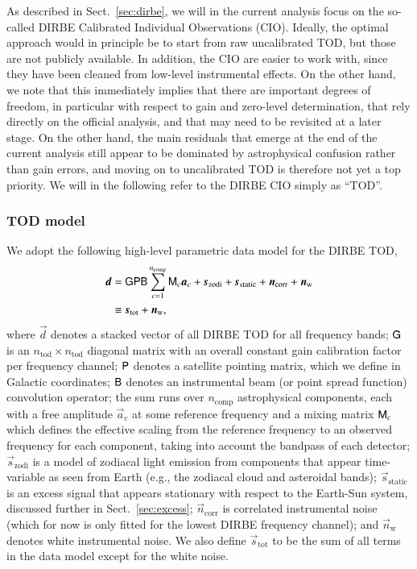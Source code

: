 \documentclass{aa}
\newcommand{\dv}[0]{\vec{d}}
\newcommand{\B}[0]{\tens{B}}
\newcommand{\G}[0]{\tens{G}}
\newcommand{\n}[0]{\vec{n}}
\newcommand{\s}[0]{\vec{s}}
\renewcommand{\a}[0]{\vec{a}}
\newcommand{\M}[0]{\tens{M}}
\renewcommand{\P}[0]{\tens{P}}
\begin{document}
As described in Sect.~\ref{sec:dirbe}, we will in the current analysis
focus on the so-called DIRBE Calibrated Individual Observations
(CIO). Ideally, the optimal approach would in principle be to start from raw uncalibrated TOD, but those are not
publicly available. In addition, the CIO are easier to work with,
since they have been cleaned from low-level instrumental effects. On
the other hand, we note that this immediately implies that there are
important degrees of freedom, in particular with respect to gain and
zero-level determination, that rely directly on the official analysis,
and that may need to be revisited at a later stage. On the other hand,
the main residuals that emerge at the end of the current analysis
still appear to be dominated by astrophysical confusion rather than
gain errors, and moving on to uncalibrated TOD is therefore not yet a
top priority. We will in the following refer to the DIRBE CIO simply
as ``TOD''.

\subsubsection{TOD model}

We adopt the following high-level parametric data model for the DIRBE
TOD,
\begin{align}
	\label{eq:model}
	\dv &=\G\P\B\sum_{c=1}^{n_{\mathrm{comp}}}\M_c\a_c+\s_{\mathrm{zodi}} +
          \s_{\mathrm{static}} + \n_\mathrm{corr} + \n_\mathrm w\\
        &\equiv \s_{\mathrm{tot}} + \n_{\mathrm{w}},
\end{align}
where $\dv$ denotes a stacked vector of all DIRBE TOD for all
frequency bands; $\G$ is an $n_{\mathrm{tod}}\times
n_{\mathrm{tod}}$ diagonal matrix with an overall constant gain
calibration factor per frequency channel; $\P$ denotes a satellite
pointing matrix, which we define in Galactic coordinates; $\B$ denotes
an instrumental beam (or point spread function) convolution operator;
the sum runs over $n_{\mathrm{comp}}$ astrophysical components, each
with a free amplitude $\a_c$ at some reference frequency and a mixing
matrix $\M_c$ which defines the effective scaling from the reference
frequency to an observed frequency for each component, taking into account the
bandpass of each detector; $\s_{\mathrm{zodi}}$ is a model of zodiacal
light emission from components that appear time-variable as seen from
Earth (e.g., the zodiacal cloud and asteroidal bands);
$\s_{\mathrm{static}}$ is an excess signal that appears stationary
with respect to the Earth-Sun system, discussed further in Sect.~\ref{sec:excess}; $\n_{\mathrm{corr}}$ is 
correlated instrumental noise (which for now is only fitted for the
lowest DIRBE frequency channel); and $\n_{\mathrm{w}}$ denotes white
instrumental noise. We also define $\s_{\mathrm{tot}}$ to be the sum
of all terms in the data model except for the white noise.
\end{document}
